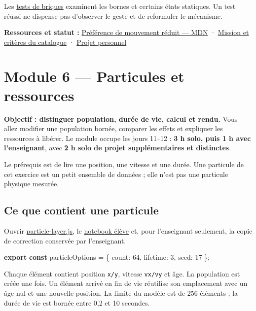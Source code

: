 \documentclass[
  canadien,
  11pt,
  a4paper,
]{report}
\newenvironment{Shaded}{}{}
\newcommand{\DataTypeTok}[1]{\textcolor[rgb]{0.56,0.13,0.00}{#1}}
\newcommand{\DecValTok}[1]{\textcolor[rgb]{0.25,0.63,0.44}{#1}}
\newcommand{\ImportTok}[1]{\textcolor[rgb]{0.00,0.50,0.00}{\textbf{#1}}}
\newcommand{\KeywordTok}[1]{\textcolor[rgb]{0.00,0.44,0.13}{\textbf{#1}}}
\newcommand{\NormalTok}[1]{#1}
\newcommand{\OperatorTok}[1]{\textcolor[rgb]{0.40,0.40,0.40}{#1}}
\begin{document}
Les \href{../../../../../tests/learning-notebooks-bricks.test.ts}{tests
de briques} examinent les bornes et certains états statiques. Un test
réussi ne dispense pas d'observer le geste et de reformuler le
mécanisme.

\textbf{Ressources et statut :}
\href{https://developer.mozilla.org/en-US/docs/Web/CSS/@media/prefers-reduced-motion}{Préférence
de mouvement réduit --- MDN} ·
\href{../../../../../packages/learning/src/catalog.ts}{Mission et
critères du catalogue} · \href{../../PROJECT.md}{Projet personnel}

\chapter{Module 6 --- Particules et
ressources}\label{module-6-particules-et-ressources}

\textbf{Objectif : distinguer population, durée de vie, calcul et
rendu.} Vous allez modifier une population bornée, comparer les effets
et expliquer les ressources à libérer. Le module occupe les jours 11--12
: \textbf{3 h solo, puis 1 h avec l'enseignant}, avec \textbf{2 h solo
de projet supplémentaires et distinctes}.

Le prérequis est de lire une position, une vitesse et une durée. Une
particule de cet exercice est un petit ensemble de données ; elle n'est
pas une particule physique mesurée.

\section{Ce que contient une
particule}\label{ce-que-contient-une-particule}

Ouvrir
\href{../../frontend/module-6/particle-layer.js}{particle-layer.js}, le
\href{../../notebooks/module-6.ipynb}{notebook élève} et, pour
l'enseignant seulement, la copie de correction conservée par
l'enseignant.

\begin{Shaded}
\begin{Highlighting}[]
\ImportTok{export} \KeywordTok{const}\NormalTok{ particleOptions }\OperatorTok{=}\NormalTok{ \{ }\DataTypeTok{count}\OperatorTok{:} \DecValTok{64}\OperatorTok{,} \DataTypeTok{lifetime}\OperatorTok{:} \DecValTok{3}\OperatorTok{,} \DataTypeTok{seed}\OperatorTok{:} \DecValTok{17}\NormalTok{ \}}\OperatorTok{;}
\end{Highlighting}
\end{Shaded}

Chaque élément contient position \texttt{x/\allowbreak{}y}, vitesse \texttt{vx/\allowbreak{}vy} et
âge. La population est créée une fois. Un élément arrivé en fin de vie
réutilise son emplacement avec un âge nul et une nouvelle position. La
limite du modèle est de 256 éléments ; la durée de vie est bornée entre
0,2 et 10 secondes.
\end{document}
